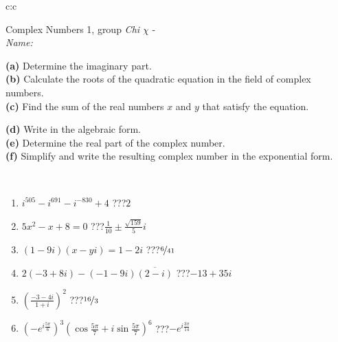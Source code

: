 \documentclass[10pt]{report}
\begin{document}
\begin{tabular}{c:c}
\begin{minipage}[c][104.5mm][t]{0.5\linewidth}
\begin{center}
\vspace{5mm}
{\huge Complex Numbers 1, group \textit{Chi $\chi$} -}\\[5mm]
\textit{Name:}\phantom{xxxxxxxxxxxxxxxxxxxxxxxxxxxxxxxxxxxxxxxxxxxxxxxxxxxxxxxxxxxxxxxxx}\\[5mm]
\begin{minipage}{0.95\linewidth}
\begin{center}
{\small \begin{minipage}{0.44\textwidth} \raggedright
\textbf{(a)} Determine the imaginary part. \\[1mm]
\textbf{(b)} Calculate the roots of the quadratic equation in the field of complex numbers. \\[1mm]
\textbf{(c)} Find the sum of the real numbers \(x\) and \(y\) that satisfy the equation. \end{minipage} \begin{minipage}{0.54\textwidth}
\textbf{(d)} Write in the algebraic form. \\[1mm]
\textbf{(e)} Determine the real part of the complex number. \\[1mm]
\textbf{(f)} Simplify and write the resulting complex number in the exponential form.
\end{minipage}
} \vspace{3mm}
\end{center}
\end{minipage}
\\[1mm]
\begin{minipage}{0.79\linewidth}
\begin{center}
\begin{varwidth}{\linewidth}
\setlength{\itemsep}{0pt}
\begin{enumerate}
\large
\item $i^{505}-i^{691}-i^{-830}+4$\quad \dotfill\; ???\;\dotfill \quad $2$
\item $5x^2-x+8=0$\quad \dotfill\; ???\;\dotfill \quad $\frac{1}{10} \pm{}\frac{ \sqrt{159}}{5}i$
\item $(1-9i)(x-yi)=1-2i$\quad \dotfill\; ???\;\dotfill \quad $\nicefrac{6}{41}$
\item $2(-3+8i)-(-1-9i)\overline{(2-i)}$\quad \dotfill\; ???\;\dotfill \quad $-13+35i$
\item $\left(\frac{-3-4i}{1+i}\right)^2$\quad \dotfill\; ???\;\dotfill \quad $\nicefrac{16}{3}$
\item $\left(-e^{i\frac{5\pi}{6}}\right)^{3}\left(\cos{\frac{5\pi}{7}}+i\sin{\frac{5\pi}{7}}\right)^{6}$\quad \dotfill\; ???\;\dotfill \quad $-e^{i\frac{3\pi}{14}}$

\end{enumerate}
\end{varwidth}
\end{center}
\end{minipage}
\end{center}
\end{minipage}
\end{tabular}
\end{document}
